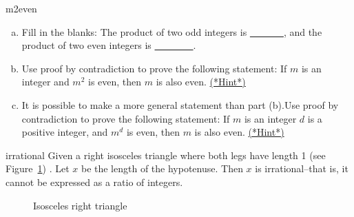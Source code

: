 \begin{exercise}{m2even}
\begin{enumerate}[(a)]
\item
Fill in the blanks:  The product of two odd integers is \underline{~~~~~~~}, and the product of two even integers is \underline{~~~~~~~~}.
\item
Use proof by contradiction to prove the following statement: If $m$ is an integer and $m^2$ is even, then $m$ is also even.
\hyperref[sec:complex:hints]{(*Hint*)}
\item 
It is possible to make a more general statement than part (b).Use proof by contradiction to prove the following statement: If $m$ is an integer $d$ is a positive integer, and $m^d$ is even, then $m$ is also even. 
\hyperref[sec:complex:hints]{(*Hint*)}
\end{enumerate}
\end{exercise}

\begin{prop}{irrational}
Given a right isosceles triangle where both legs have length 1 (see Figure~\ref{fig:complex:isosceles_right}) .  Let $x$ be the length of the hypotenuse.  Then $x$ is irrational--that is, it cannot be expressed as a ratio of integers. 
\end{prop}
\begin{figure}[htb]
	  \caption{\label{fig:complex:isosceles_right} Isosceles right triangle }
\end{figure}

